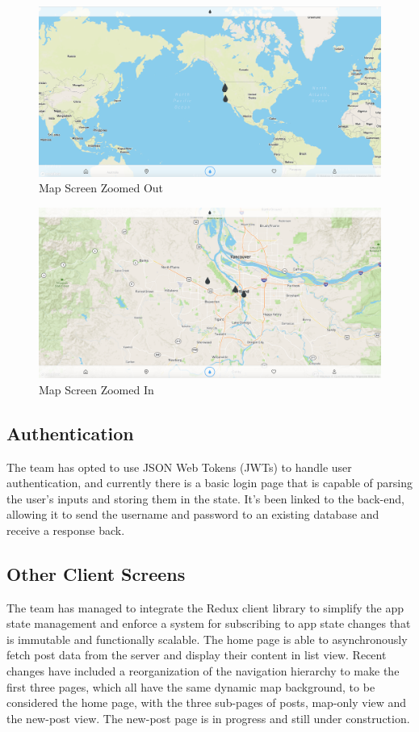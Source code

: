 \documentclass[draftclsnofoot, onecolumn, letterpaper,10pt,compsoc]{IEEEtran}
\begin{document}
\begin{figure}[!ht]
    \centering
    \includegraphics[scale=.25]{images/Map1.png}
    \caption{Map Screen Zoomed Out}
    \label{fig:my_label}
\end{figure}
\begin{figure}[!ht]
    \centering
    \includegraphics[scale=.25]{images/Map2.png}
    \caption{Map Screen Zoomed In}
    \label{fig:my_label}
\end{figure}

\pagebreak

\subsection{Authentication}
The team has opted to use JSON Web Tokens (JWTs) to handle user authentication, and currently there is a basic login page that is capable of parsing the user's inputs and storing them in the state. It's been linked to the back-end, allowing it to send the username and password to an existing database and receive a response back.

\subsection{Other Client Screens}
The team has managed to integrate the Redux client library to simplify the app state management and enforce a system for subscribing to app state changes that is immutable and functionally scalable. The home page is able to asynchronously fetch post data from the server and display their content in list view. Recent changes have included a reorganization of the navigation hierarchy to make the first three pages, which all have the same dynamic map background, to be considered the home page, with the three sub-pages of posts, map-only view and the new-post view. The new-post page is in progress and still under construction.
\end{document}
